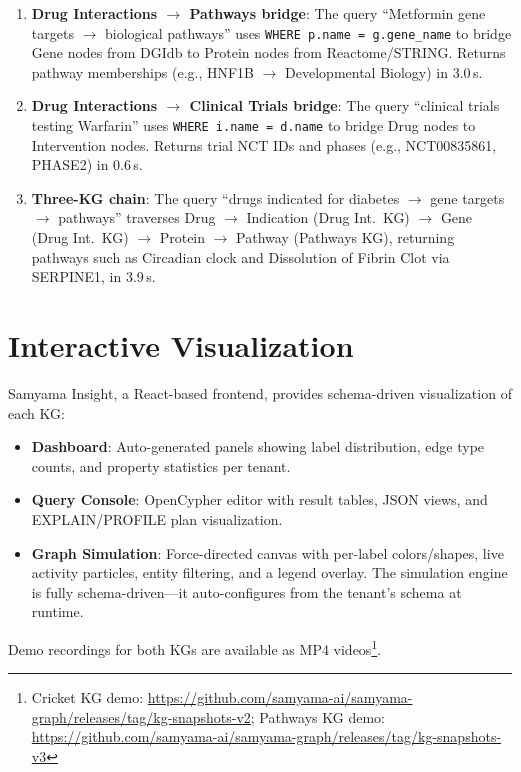 \documentclass[11pt]{article}
\begin{document}
\begin{enumerate}[leftmargin=*]
  \item \textbf{Drug Interactions $\to$ Pathways bridge}: The query ``Metformin gene targets $\to$ biological pathways'' uses \texttt{WHERE p.name = g.gene\_name} to bridge Gene nodes from DGIdb to Protein nodes from Reactome/STRING. Returns pathway memberships (e.g., HNF1B $\to$ Developmental Biology) in 3.0\,s.
  \item \textbf{Drug Interactions $\to$ Clinical Trials bridge}: The query ``clinical trials testing Warfarin'' uses \texttt{WHERE i.name = d.name} to bridge Drug nodes to Intervention nodes. Returns trial NCT IDs and phases (e.g., NCT00835861, PHASE2) in 0.6\,s.
  \item \textbf{Three-KG chain}: The query ``drugs indicated for diabetes $\to$ gene targets $\to$ pathways'' traverses Drug $\to$ Indication (Drug Int.~KG) $\to$ Gene (Drug Int.~KG) $\to$ Protein $\to$ Pathway (Pathways KG), returning pathways such as Circadian clock and Dissolution of Fibrin Clot via SERPINE1, in 3.9\,s.
\end{enumerate}

\section{Interactive Visualization}

Samyama Insight, a React-based frontend, provides schema-driven visualization of each KG:

\begin{itemize}[leftmargin=*]
  \item \textbf{Dashboard}: Auto-generated panels showing label distribution, edge type counts, and property statistics per tenant.
  \item \textbf{Query Console}: OpenCypher editor with result tables, JSON views, and EXPLAIN/PROFILE plan visualization.
  \item \textbf{Graph Simulation}: Force-directed canvas with per-label colors/shapes, live activity particles, entity filtering, and a legend overlay. The simulation engine is fully schema-driven---it auto-configures from the tenant's schema at runtime.
\end{itemize}

Demo recordings for both KGs are available as MP4 videos\footnote{Cricket KG demo: \url{https://github.com/samyama-ai/samyama-graph/releases/tag/kg-snapshots-v2}; Pathways KG demo: \url{https://github.com/samyama-ai/samyama-graph/releases/tag/kg-snapshots-v3}}.
\end{document}
